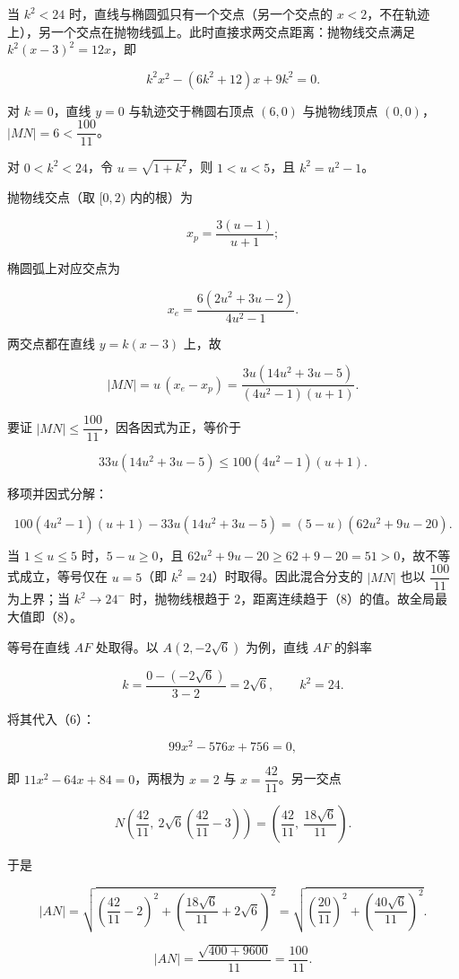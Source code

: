 \begin{answer}
当 $k^2<24$ 时，直线与椭圆弧只有一个交点（另一个交点的 $x<2$，不在轨迹上），另一个交点在抛物线弧上。此时直接求两交点距离：抛物线交点满足 $k^2(x-3)^2=12x$，即

\nopagebreak[4]
\[k^2x^2-(6k^2+12)x+9k^2=0. \tag{9}\]

对 $k=0$，直线 $y=0$ 与轨迹交于椭圆右顶点 $(6,0)$ 与抛物线顶点 $(0,0)$，$|MN|=6<\dfrac{100}{11}$。

对 $0<k^2<24$，令 $u=\sqrt{1+k^2}$，则 $1<u<5$，且 $k^2=u^2-1$。

抛物线交点（取 $[0,2)$ 内的根）为

\nopagebreak[4]
\[x_p=\frac{3(u-1)}{u+1};\]

椭圆弧上对应交点为

\nopagebreak[4]
\[x_e=\frac{6(2u^2+3u-2)}{4u^2-1}.\]

两交点都在直线 $y=k(x-3)$ 上，故

\nopagebreak[4]
\[|MN|=u\,(x_e-x_p)
=\frac{3u(14u^2+3u-5)}{(4u^2-1)(u+1)}. \tag{10}\]

要证 $|MN|\leqslant\dfrac{100}{11}$，因各因式为正，等价于

\nopagebreak[4]
\[33u(14u^2+3u-5)\leqslant100(4u^2-1)(u+1).\]

移项并因式分解：

\nopagebreak[4]
\[100(4u^2-1)(u+1)-33u(14u^2+3u-5)
=(5-u)(62u^2+9u-20).\]

当 $1\leqslant u\leqslant5$ 时，$5-u\geqslant0$，且 $62u^2+9u-20\geqslant62+9-20=51>0$，故不等式成立，等号仅在 $u=5$（即 $k^2=24$）时取得。因此混合分支的 $|MN|$ 也以 $\dfrac{100}{11}$ 为上界；当 $k^2\to24^-$ 时，抛物线根趋于 $2$，距离连续趋于（8）的值。故全局最大值即（8）。

等号在直线 $AF$ 处取得。以 $A(2,-2\sqrt6)$ 为例，直线 $AF$ 的斜率

\nopagebreak[4]
\[k=\frac{0-(-2\sqrt6)}{3-2}=2\sqrt6,\qquad k^2=24.\]

将其代入（6）：

\nopagebreak[4]
\[99x^2-576x+756=0,\]

即 $11x^2-64x+84=0$，两根为 $x=2$ 与 $x=\dfrac{42}{11}$。另一交点

\nopagebreak[4]
\[N\left(\frac{42}{11},\ 2\sqrt6\left(\frac{42}{11}-3\right)\right)
=\left(\frac{42}{11},\ \frac{18\sqrt6}{11}\right).\]

于是

\nopagebreak[4]
\[|AN|=\sqrt{\left(\frac{42}{11}-2\right)^2+\left(\frac{18\sqrt6}{11}+2\sqrt6\right)^2}
=\sqrt{\left(\frac{20}{11}\right)^2+\left(\frac{40\sqrt6}{11}\right)^2}.\]

\nopagebreak[4]
\[|AN|=\frac{\sqrt{400+9600}}{11}=\frac{100}{11}.\]


\end{answer}
